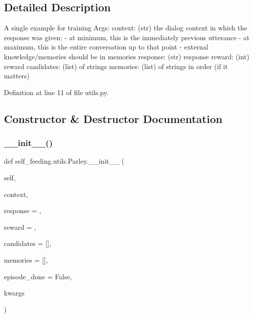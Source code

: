 \subsection{Detailed Description}
\begin{DoxyVerb}A single example for training
Args:
    context: (str) the dialog context in which the response was given;
        - at minimum, this is the immediately previous utterance
        - at maximum, this is the entire conversation up to that point
        - external knowledge/memories should be in memories
    response: (str) response
    reward: (int) reward
    candidates: (list) of strings
    memories: (list) of strings in order (if it matters)
\end{DoxyVerb}
 

Definition at line 11 of file utils.\+py.



\subsection{Constructor \& Destructor Documentation}
\mbox{\label{classself__feeding_1_1utils_1_1Parley_aeda0932760261f607b8725914e37a75c}} 
\subsubsection{\texorpdfstring{\+\_\+\+\_\+init\+\_\+\+\_\+()}{\_\_init\_\_()}}
{\footnotesize\ttfamily def self\+\_\+feeding.\+utils.\+Parley.\+\_\+\+\_\+init\+\_\+\+\_\+ (\begin{DoxyParamCaption}\item[{}]{self,  }\item[{}]{context,  }\item[{}]{response = {\ttfamily \textquotesingle{}\textquotesingle{}},  }\item[{}]{reward = {},  }\item[{}]{candidates = {\ttfamily \mbox{[}\mbox{]}},  }\item[{}]{memories = {\ttfamily \mbox{[}\mbox{]}},  }\item[{}]{episode\+\_\+done = {\ttfamily False},  }\item[{}]{kwargs }\end{DoxyParamCaption})}



